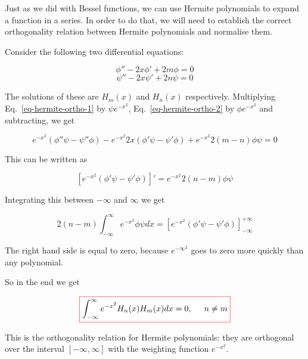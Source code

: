 
Just as we did with Bessel functions, we can use Hermite polynomials to expand a function in a series. In order to do that, we will need to establish the correct orthogonality relation between Hermite polynomials and normalise them.

Consider the following two differential equations:

\begin{equation}
\phi'' - 2 x \phi' + 2m \phi = 0 \label{eq-hermite-ortho-1}
\end{equation}
\begin{equation}
\psi'' - 2 x \psi' + 2n \psi = 0 \label{eq-hermite-ortho-2}
\end{equation}

The solutions of these are $H_m(x)$ and $H_n(x)$ respectively. Multiplying Eq.~\ref{eq-hermite-ortho-1} by $\psi e^{-x^2}$, Eq.~\ref{eq-hermite-ortho-2} by $\phi e^{-x^2}$ and subtracting, we get

\begin{equation}
e^{-x^2}\left(\phi''\psi -\psi''\phi\right)- e^{-x^2} 2 x \left(\phi'\psi -\psi'\phi\right)+ e^{-x^2}2(m-n)\phi\psi = 0
\end{equation} 

This can be written as

\begin{equation}
\left[e^{-x^2}\left(\phi'\psi -\psi'\phi\right)\right]' = e^{-x^2}2(n-m)\phi\psi
\end{equation} 

Integrating this between $-\infty$ and $\infty$ we get

\begin{equation}
2(n-m)\int_{-\infty}^{\infty}e^{-x^2}\phi\psi dx = \left[e^{-x^2}\left(\phi'\psi -\psi'\phi\right)\right]_{-\infty}^{+\infty}
\end{equation} 

The right hand side is equal to zero, because $e^{-{\infty}^2}$ goes to zero more quickly than any polynomial.

So in the end we get

\begin{equation}
\fbox{$\displaystyle
\int_{-\infty}^{\infty}e^{-x^2}H_n(x)H_m(x)dx = 0, \hspace{0.5cm} n \ne m \label{eq-hermite-ortho}
$}
\end{equation} 

This is the orthogonality relation for Hermite polynomials: they are orthogonal over the interval $[-\infty, \infty]$ with the weighting function $e^{-x^2}$.


